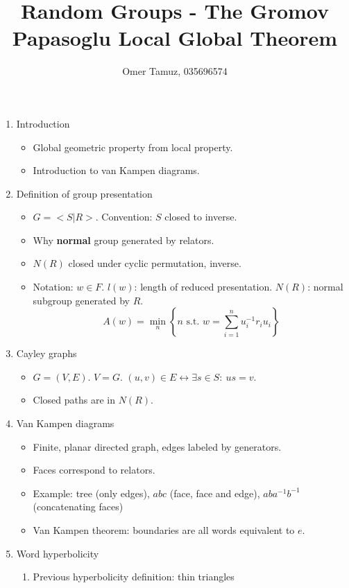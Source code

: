 \documentclass[11pt]{article} \usepackage{amssymb}
\begin{document}
\title{Random Groups - The Gromov Papasoglu Local Global Theorem}

 \author{Omer Tamuz, 035696574}
\maketitle

\begin{enumerate}
\item Introduction
  \begin{itemize}
  \item Global geometric property from local property.
  \item Introduction to van Kampen diagrams.
  \end{itemize}
\item Definition of group presentation
  \begin{itemize}
  \item $G=<S|R>$. Convention: $S$ closed to inverse.
  \item Why {\bf normal} group generated by relators.
  \item $N(R)$ closed under cyclic permutation, inverse.
  \item Notation: $w\in F$. $l(w)$: length of reduced presentation.
    $N(R)$: normal subgroup generated by $R$.
    $$ A(w)=\min_n\left\{n\mbox{ s.t. } w=\sum_{i=1}^nu_i^{-1}r_iu_i\right\}$$
  \end{itemize}
\item Cayley graphs
  \begin{itemize}
  \item $G=(V,E)$. $V=G$. $(u,v)\in E \leftrightarrow \exists s\in S:\:us=v$.
  \item Closed paths are in $N(R)$.
  \end{itemize}
\item Van Kampen diagrams
  \begin{itemize}
  \item Finite, planar directed graph, edges labeled by generators.
  \item Faces correspond to relators.
  \item Example: tree (only edges), $abc$ (face, face and edge),
    $aba^{-1}b^{-1}$ (concatenating faces)
  \item Van Kampen theorem: boundaries are all words equivalent to $e$.
  \end{itemize} 
\item Word hyperbolicity
  \begin{enumerate}
  \item Previous hyperbolicity definition: thin triangles

\end{enumerate}
\end{enumerate}
\end{document}
